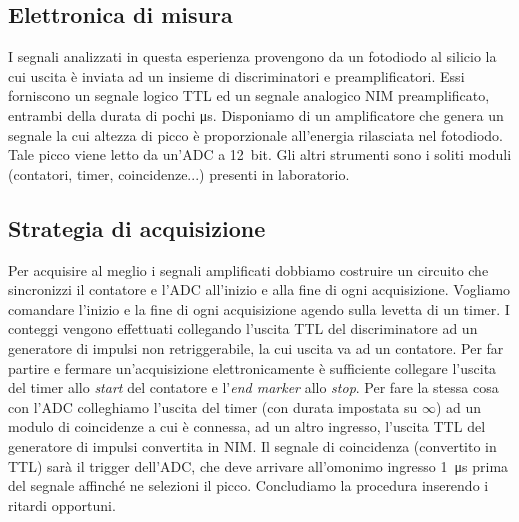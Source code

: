 \subsection{Elettronica di misura}


I segnali analizzati in questa esperienza provengono da un fotodiodo al silicio la cui uscita è inviata ad un insieme di discriminatori e preamplificatori. Essi forniscono un segnale logico TTL ed un segnale analogico NIM preamplificato, entrambi della durata di pochi \si{\micro s}.
Disponiamo di un amplificatore che genera un segnale la cui altezza di picco è proporzionale all'energia rilasciata nel fotodiodo.
Tale picco viene letto da un'ADC a \SI{12}{bit}. Gli altri strumenti sono i soliti moduli (contatori, timer, coincidenze...) presenti in laboratorio.

\subsection{Strategia di acquisizione}

Per acquisire al meglio i segnali amplificati dobbiamo costruire un circuito che sincronizzi il contatore e l'ADC all'inizio e alla fine di ogni acquisizione.
Vogliamo comandare l'inizio e la fine di ogni acquisizione agendo sulla levetta di un timer.
I conteggi vengono effettuati collegando l'uscita TTL del discriminatore ad un generatore di impulsi non retriggerabile, la cui uscita va ad un contatore. Per far partire e fermare un'acquisizione elettronicamente è sufficiente collegare l'uscita del timer allo \emph{start} del contatore e l'\emph{end marker} allo \emph{stop}.
Per fare la stessa cosa con l'ADC colleghiamo l'uscita del timer (con durata impostata su $\infty$) ad un modulo di coincidenze a cui è connessa, ad un altro ingresso, l'uscita TTL del generatore di impulsi convertita in NIM. Il segnale di coincidenza (convertito in TTL) sarà il trigger dell'ADC, che deve arrivare all'omonimo ingresso \SI{1}{\micro s} prima del segnale affinché ne selezioni il picco.
Concludiamo la procedura inserendo i ritardi opportuni.